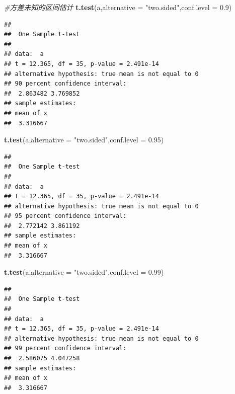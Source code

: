 \documentclass[]{article}
\newenvironment{Shaded}{\begin{snugshade}}{\end{snugshade}}
\newcommand{\KeywordTok}[1]{\textcolor[rgb]{0.13,0.29,0.53}{\textbf{#1}}}
\newcommand{\DataTypeTok}[1]{\textcolor[rgb]{0.13,0.29,0.53}{#1}}
\newcommand{\FloatTok}[1]{\textcolor[rgb]{0.00,0.00,0.81}{#1}}
\newcommand{\StringTok}[1]{\textcolor[rgb]{0.31,0.60,0.02}{#1}}
\newcommand{\CommentTok}[1]{\textcolor[rgb]{0.56,0.35,0.01}{\textit{#1}}}
\newcommand{\NormalTok}[1]{#1}
\begin{document}
\begin{Shaded}
\begin{Highlighting}[]
\CommentTok{#方差未知的区间估计}
\KeywordTok{t.test}\NormalTok{(a,}\DataTypeTok{alternative =} \StringTok{"two.sided"}\NormalTok{,}\DataTypeTok{conf.level =} \FloatTok{0.9}\NormalTok{)}
\end{Highlighting}
\end{Shaded}

\begin{verbatim}
## 
##  One Sample t-test
## 
## data:  a
## t = 12.365, df = 35, p-value = 2.491e-14
## alternative hypothesis: true mean is not equal to 0
## 90 percent confidence interval:
##  2.863482 3.769852
## sample estimates:
## mean of x 
##  3.316667
\end{verbatim}

\begin{Shaded}
\begin{Highlighting}[]
\KeywordTok{t.test}\NormalTok{(a,}\DataTypeTok{alternative =} \StringTok{"two.sided"}\NormalTok{,}\DataTypeTok{conf.level =} \FloatTok{0.95}\NormalTok{)}
\end{Highlighting}
\end{Shaded}

\begin{verbatim}
## 
##  One Sample t-test
## 
## data:  a
## t = 12.365, df = 35, p-value = 2.491e-14
## alternative hypothesis: true mean is not equal to 0
## 95 percent confidence interval:
##  2.772142 3.861192
## sample estimates:
## mean of x 
##  3.316667
\end{verbatim}

\begin{Shaded}
\begin{Highlighting}[]
\KeywordTok{t.test}\NormalTok{(a,}\DataTypeTok{alternative =} \StringTok{"two.sided"}\NormalTok{,}\DataTypeTok{conf.level =} \FloatTok{0.99}\NormalTok{)}
\end{Highlighting}
\end{Shaded}

\begin{verbatim}
## 
##  One Sample t-test
## 
## data:  a
## t = 12.365, df = 35, p-value = 2.491e-14
## alternative hypothesis: true mean is not equal to 0
## 99 percent confidence interval:
##  2.586075 4.047258
## sample estimates:
## mean of x 
##  3.316667
\end{verbatim}
\end{document}

